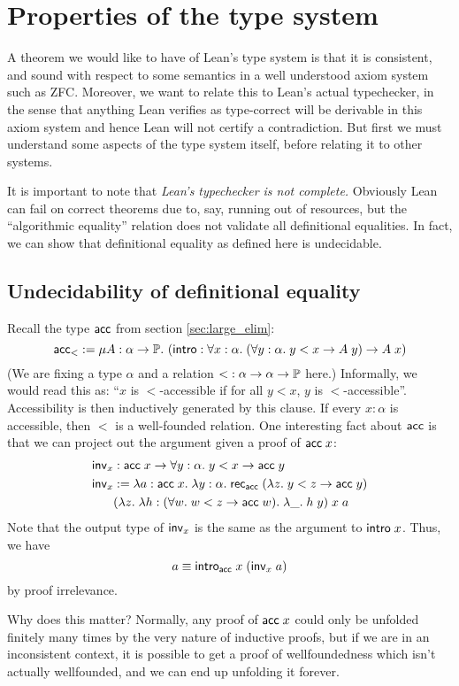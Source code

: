 \section{Properties of the type system}
A theorem we would like to have of Lean's type system is that it is consistent, and sound with respect to some semantics in a well understood axiom system such as ZFC. Moreover, we want to relate this to Lean's actual typechecker, in the sense that anything Lean verifies as type-correct will be derivable in this axiom system and hence Lean will not certify a contradiction. But first we must understand some aspects of the type system itself, before relating it to other systems.

It is important to note that \emph{Lean's typechecker is not complete.} Obviously Lean can fail on correct theorems due to, say, running out of resources, but the ``algorithmic equality'' relation does not validate all definitional equalities. In fact, we can show that definitional equality as defined here is undecidable.

\subsection{Undecidability of definitional equality}\label{sec:undecidable}
Recall the type $\acc$ from section \ref{sec:large_elim}:
$$\acc_{<}:=\mu A:\alpha\to\P.\ (\intro:\forall x:\alpha.\;(\forall y:\alpha.\;y<x\to A\;y)\to A\;x)$$
(We are fixing a type $\alpha$ and a relation ${<}:\alpha\to\alpha\to\P$ here.) Informally, we would read this as: ``$x$ is $<$-accessible if for all $y<x$, $y$ is $<$-accessible''. Accessibility is then inductively generated by this clause. If every $x:\alpha$ is accessible, then $<$ is a well-founded relation. One interesting fact about $\acc$ is that we can project out the argument given a proof of $\acc\;x$:
\begin{align*}
\inv_x&:\acc\;x\to\forall y:\alpha.\;y<x\to\acc\;y\\
\inv_x&:=\lambda a:\acc\;x.\;\lambda y:\alpha.\;\rec_{\acc}\;(\lambda z.\;y<z\to\acc\;y)\\
&(\lambda z.\;\lambda h:(\forall w.\;w<z\to\acc\;w).\;\lambda \_.\;h\;y)\;x\;a
\end{align*}
Note that the output type of $\inv_x$ is the same as the argument to $\intro\;x$. Thus, we have
$$a\equiv\intro_\acc\;x\;(\inv_x\;a)$$
by proof irrelevance.

Why does this matter? Normally, any proof of $\acc\;x$ could only be unfolded finitely many times by the very nature of inductive proofs, but if we are in an inconsistent context, it is possible to get a proof of wellfoundedness which isn't actually wellfounded, and we can end up unfolding it forever.

